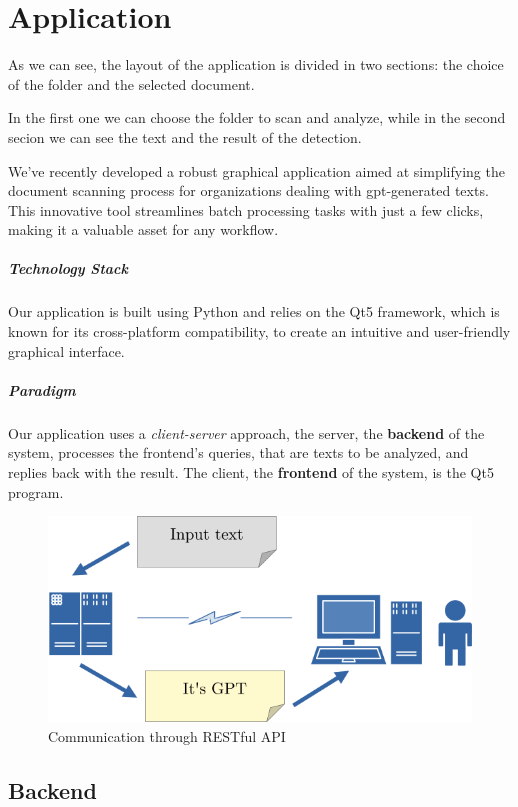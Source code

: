 \chapter{Application}

As we can see, the layout of the application is divided in two sections: the choice of the folder and the selected document.

In the first one we can choose the folder to scan and analyze, while in the second secion we can see the text and the
result of the detection.

We've recently developed a robust graphical application aimed at simplifying the document scanning process for 
organizations dealing with gpt-generated texts. This innovative tool streamlines batch processing tasks with just 
a few clicks, making it a valuable asset for any workflow.

\paragraph{Technology Stack} Our application is built using Python and relies on the Qt5 framework, which is known 
for its cross-platform compatibility, to create an intuitive and user-friendly graphical interface.

\paragraph{Paradigm}
Our application uses a \textit{client-server} approach, the server, the \textbf{backend} of the system, processes the frontend's queries, that are texts to be analyzed, and replies back with the result. The client, the \textbf{frontend} of the system, is the Qt5 program.

\begin{figure}
	\centering
	\includegraphics[width=0.7\linewidth]{images/Application/diagramma}
	\caption{Communication through RESTful API}
	\label{fig:diagramma}
\end{figure}

\section{Backend}

